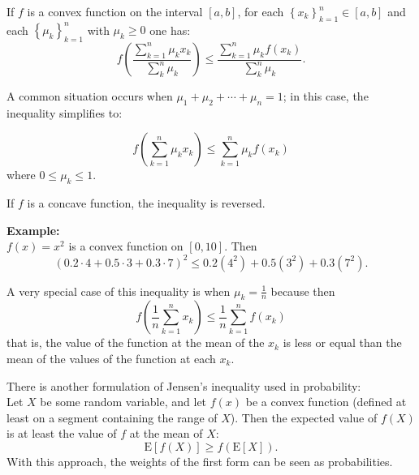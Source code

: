 \documentclass[12pt]{article}
\begin{document}
If $f$ is a convex function on the interval $[a,b]$, for each $\left\{x_k\right\}_{k=1}^n \in[a,b]$ and each $\left\{\mu_k\right\}_{k=1}^n$ with $\mu_{k}\geq0$ one has:
$$f\left(\frac{\sum_{k=1}^{n}\mu_{k}x_{k}}{\sum_{k}^{n}\mu_{k}}\right)\leq\frac{\sum_{k=1}^{n}\mu_{k}f\left(x_{k}\right)}{\sum_{k}^{n}\mu_{k}}.$$

A common situation occurs when $\mu_1+\mu_2+\cdots+\mu_n=1$; in this case, the inequality simplifies to:

$$f\left(\sum_{k=1}^n \mu_k x_k\right)\leq \sum_{k=1}^n \mu_k f(x_k)$$
where $0\le \mu_k\le 1$.

If $f$ is a concave function, the inequality is reversed.
\medskip

\textbf{Example:}\\
$f(x)=x^2$ is a convex function on $[0,10]$. 
Then 
$$(0.2\cdot4+ 0.5\cdot3+0.3\cdot7)^2 \leq 0.2(4^2) + 0.5(3^2)+0.3(7^2).$$
\bigskip

A very special case of this inequality is when $\mu_k=\frac{1}{n}$ because then
$$f\left(\frac{1}{n}\sum_{k=1}^n x_k\right)\le\frac{1}{n}\sum_{k=1}^n f(x_k)$$
that is, the value of the function at the mean of the $x_k$ is less or equal than the mean of the values of the function at each $x_k$.

There is another formulation of Jensen's inequality used in probability:\\
Let $X$ be some random variable, and let $f(x)$ be a convex function (defined at least on a segment containing the range of $X$).  Then the expected value of $f(X)$ is at least the value of $f$ at the mean of $X$:
\[
\mathrm{E}[f(X)] \ge f(\mathrm{E}[ X]).
\]
With this approach, the weights of the first form can be seen as probabilities.
\end{document}
